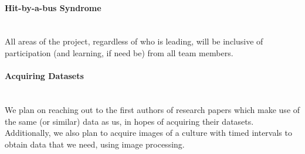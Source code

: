 \paragraph{Hit-by-a-bus Syndrome}
\mbox{}\\
All areas of the project, regardless of who is leading, will be inclusive of participation (and learning, if need be) from all team members. 

\paragraph{Acquiring Datasets}
\mbox{}\\
We plan on reaching out to the first authors of research papers which make use of the same (or similar) data as us, in hopes of acquiring their datasets. Additionally, we also plan to acquire images of a culture with timed intervals to obtain data that we need, using image processing.
